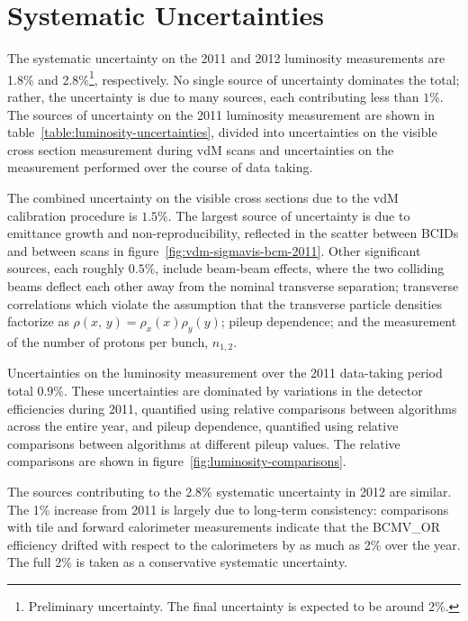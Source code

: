 \section{Systematic Uncertainties}\label{sec:luminosity-uncertainties}
The systematic uncertainty on the 2011 and 2012 luminosity measurements are 1.8\% and 2.8\%\footnote{Preliminary uncertainty. The final uncertainty is expected to be around 2\%.}, respectively. No single source of uncertainty dominates the total; rather, the uncertainty is due to many sources, each contributing less than $1\%$. The sources of uncertainty on the 2011 luminosity measurement are shown in table~\ref{table:luminosity-uncertainties}, divided into uncertainties on the visible cross section measurement during vdM scans and uncertainties on the measurement performed over the course of data taking. 

The combined uncertainty on the visible cross sections due to the vdM calibration procedure is $1.5\%$. The largest source of uncertainty is due to emittance growth and non-reproducibility, reflected in the scatter between BCIDs and between scans in figure~\ref{fig:vdm-sigmavis-bcm-2011}. Other significant sources, each roughly $0.5\%$, include beam-beam effects, where the two colliding beams deflect each other away from the nominal transverse separation; transverse correlations which violate the assumption that the transverse particle densities factorize as $\rho(x,\,y)=\rho_x(x)\rho_y(y)$; pileup dependence; and the measurement of the number of protons per bunch, $n_{1,2}$. 

Uncertainties on the luminosity measurement over the 2011 data-taking period total $0.9\%$. These uncertainties are dominated by variations in the detector efficiencies during 2011, quantified using relative comparisons between algorithms across the entire year, and pileup dependence, quantified using relative comparisons between algorithms at different pileup values. The relative comparisons are shown in figure~\ref{fig:luminosity-comparisons}.

The sources contributing to the 2.8\% systematic uncertainty in 2012 are similar. The 1\% increase from 2011 is largely due to long-term consistency: comparisons with tile and forward calorimeter measurements indicate that the BCMV\_OR efficiency drifted with respect to the calorimeters by as much as 2\% over the year. The full 2\% is taken as a conservative systematic uncertainty. 

